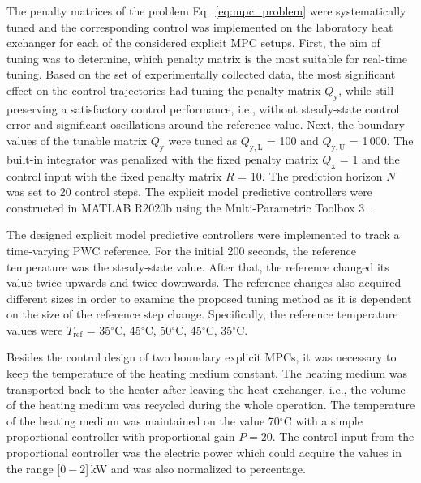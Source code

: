 \documentclass[preprint,12pt]{elsarticle}
\begin{document}
	The penalty matrices of the problem Eq.~\eqref{eq:mpc_problem} were systematically tuned and the corresponding control was implemented on the laboratory heat exchanger for each of the considered explicit MPC setups. 
	First, the aim of tuning was to determine, which penalty matrix is the most suitable for real-time tuning. Based on the set of experimentally collected data, the most significant effect on the control trajectories had tuning the penalty matrix $Q_\mathrm{y}$, while still preserving a satisfactory control performance, i.e., without steady-state control error and significant oscillations around the reference value. Next, the boundary values of the tunable matrix $Q_\mathrm{y}$ were tuned as $Q_\mathrm{y, L}$ = 100 and $Q_\mathrm{y, U}$ = 1\,000. The built-in integrator was penalized with the fixed penalty matrix $Q_\mathrm{x}$ = 1 and the control input with the fixed penalty matrix $R$ = 10. The prediction horizon $N$ was set to 20 control steps. The explicit model predictive controllers were constructed in MATLAB R2020b using the Multi-Parametric Toolbox 3~\cite{mpt_conf}. 
	
	
	The designed explicit model predictive controllers were implemented to track a time-varying PWC reference. 
	For the initial 200 seconds, the reference temperature was the steady-state value. After that, the reference changed its value twice upwards and twice downwards. The reference changes also acquired different sizes in order to examine the proposed tuning method as it is dependent on the size of the reference step change. Specifically, the reference temperature values were $T_{\mathrm{ref}}$ = 35$^{\circ}\mathrm{C}$, 45$^{\circ}\mathrm{C}$, 50$^{\circ}\mathrm{C}$, 45$^{\circ}\mathrm{C}$, 35$^{\circ}\mathrm{C}$.
	
	Besides the control design of two boundary explicit MPCs, it was necessary to keep the temperature of the heating medium constant. The heating medium was transported back to the heater after leaving the heat exchanger, i.e., the volume of the heating medium was recycled during the whole operation. The temperature of the heating medium was maintained on the value 70$^{\circ}\mathrm{C}$ with a simple proportional controller with proportional gain $P = 20$. The control input from the proportional controller was the electric power which could acquire the values in the range [$0-2$]\,kW and was also normalized to percentage.
	
\end{document}
